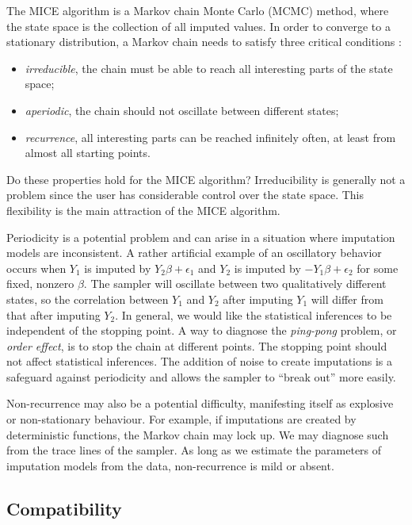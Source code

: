 \documentclass[
]{book}
\providecommand{\tightlist}{%
  \setlength{\itemsep}{0pt}\setlength{\parskip}{0pt}}
\begin{document}
The MICE algorithm is a Markov chain Monte Carlo (MCMC) method, where the state space is the collection of all imputed values. In order to converge to a stationary distribution, a Markov chain needs to satisfy three critical conditions \citep{ROBERTS1996, TIERNEY1996}:

\begin{itemize}
\tightlist
\item
  \emph{irreducible}, the chain must be able to reach all interesting
  parts of the state space;
\item
  \emph{aperiodic}, the chain should not oscillate between different
  states;
\item
  \emph{recurrence}, all interesting parts can be reached infinitely
  often, at least from almost all starting points.
\end{itemize}

Do these properties hold for the MICE algorithm? Irreducibility is generally not a problem since the user has considerable control over the state space. This flexibility is the main attraction of the MICE algorithm.

Periodicity is a potential problem and can arise in a situation where imputation models are inconsistent. A rather artificial example of an oscillatory behavior occurs when \(Y_1\) is imputed by \(Y_2\beta+\epsilon_1\) and \(Y_2\) is imputed by \(-Y_1\beta+\epsilon_2\) for some fixed, nonzero \(\beta\). The sampler will oscillate between two qualitatively different states, so the correlation between \(Y_1\) and \(Y_2\) after imputing \(Y_1\) will differ from that after imputing \(Y_2\). In general, we would like the statistical inferences to be independent of the stopping point. A way to diagnose the \emph{ping-pong} problem, or \emph{order effect}, is to stop the chain at different points. The stopping point should not affect statistical inferences. The addition of noise to create imputations is a safeguard against periodicity and allows the sampler to ``break out'' more easily.

Non-recurrence may also be a potential difficulty, manifesting itself as explosive or non-stationary behaviour. For example, if imputations are created by deterministic functions, the Markov chain may lock up. We may diagnose such from the trace lines of the sampler. As long as we estimate the parameters of imputation models from the data, non-recurrence is mild or absent.

\hypertarget{compatibility}{%
\subsection{Compatibility}\label{compatibility}}
\end{document}
